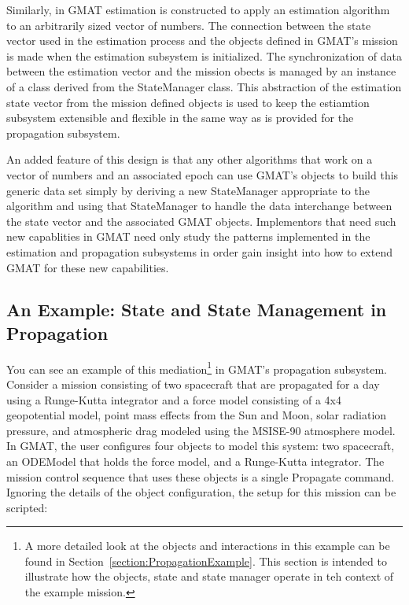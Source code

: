 Similarly, in GMAT estimation is constructed to apply an estimation algorithm to an arbitrarily
sized vector of numbers.  The connection between the state vector used in the estimation process and
the objects defined in GMAT's mission is made when the estimation subsystem is initialized.  The
synchronization of data between the estimation vector and the mission obects is managed by an
instance of a class derived from the StateManager class.  This abstraction of the estimation state
vector from the mission defined objects is used to keep the estiamtion subsystem extensible and
flexible in the same way as is provided for the propagation subsystem.

An added feature of this design is that any other algorithms that work on a vector of numbers
and an associated epoch can use GMAT's objects to build this generic data set simply by deriving a
new StateManager appropriate to the algorithm and using that StateManager to handle the data
interchange between the state vector and the associated GMAT objects.  Implementors that need such
new capablities in GMAT need only study the patterns implemented in the estimation and propagation
subsystems in order gain insight into how to extend GMAT for these new capabilities.

\subsection[A Propagation State Example]{An Example: State and State Management in Propagation}

You can see an example of this mediation\footnote{A more detailed look at the objects and
interactions in this example can be found in Section~\ref{section:PropagationExample}.  This
section is intended to illustrate how the objects, state and state manager operate in teh context
of the example mission.} in GMAT's propagation subsystem. Consider a mission consisting of two
spacecraft that are propagated for a day using a Runge-Kutta integrator and a force model consisting
of a 4x4 geopotential model, point mass effects from the Sun and Moon, solar radiation pressure, and
atmospheric drag modeled using the MSISE-90 atmosphere model.  In GMAT, the user configures four
objects to model this system: two spacecraft, an ODEModel that holds the force model, and a
Runge-Kutta integrator.  The mission control sequence that uses these objects is a single Propagate
command.  Ignoring the details of the object configuration, the setup for this mission can be
scripted:


